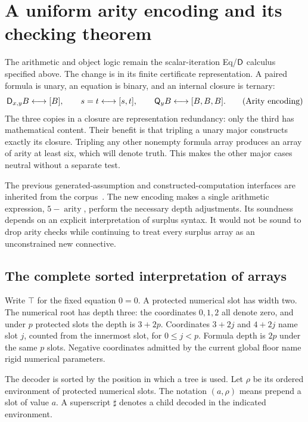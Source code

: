 \section{A uniform arity encoding and its checking theorem}
\label{sec:arity-checker}

The arithmetic and object logic remain the scalar-iteration Eq/$\mathsf D$
calculus specified above.  The change is in its finite certificate
representation.  A paired formula is unary, an equation is binary, and
an internal closure is ternary:
\[
 \mathsf D_{x,y}B\longleftrightarrow[B],\qquad
 s=t\longleftrightarrow[s,t],\qquad
 \mathsf Q_yB\longleftrightarrow[B,B,B].
 \tag{Arity encoding}\label{eq:arity-encoding}
\]
The three copies in a closure are representation redundancy: only the
third has mathematical content.  Their benefit is that tripling a unary
major constructs exactly its closure.  Tripling any other nonempty
formula array produces an array of arity at least six, which will denote
truth.  This makes the other major cases neutral without a separate
test.

The previous generated-assumption and constructed-computation interfaces
are inherited from the corpus~\cite{generated,constructed}.  The new
encoding makes a single arithmetic expression, $5-\operatorname{arity}$,
perform the necessary depth adjustments.  Its soundness depends on an
explicit interpretation of surplus syntax.  It would not be sound to
drop arity checks while continuing to treat every surplus array as an
unconstrained new connective.

\subsection{The complete sorted interpretation of arrays}
\label{subsec:sorted-arrays}

Write $\top$ for the fixed equation $0=0$.  A protected numerical slot
has width two.  The numerical root has depth three: the coordinates
$0,1,2$ all denote zero, and under $p$ protected slots the depth is
$3+2p$.  Coordinates $3+2j$ and $4+2j$ name slot $j$, counted from
the innermost slot, for $0\leq j<p$.  Formula depth is $2p$ under the
same $p$ slots.  Negative coordinates admitted by the current global
floor name rigid numerical parameters.

The decoder is sorted by the position in which a tree is used.  Let
$\rho$ be its ordered environment of protected numerical slots.
The notation $(a,\rho)$ means prepend a slot of value $a$.
A superscript $\sharp$ denotes a child decoded in the indicated
environment.

